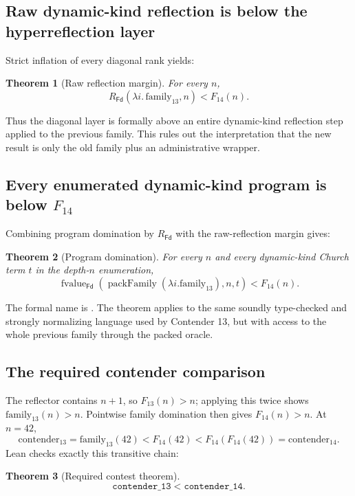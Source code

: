 \documentclass[11pt]{article}
\newtheorem{theorem}{Theorem}[section]
\theoremstyle{definition}
\newcommand{\Fd}{\mathsf{Fd}}
\begin{document}
\subsection{Raw dynamic-kind reflection is below the hyperreflection layer}

Strict inflation of every diagonal rank yields:

\begin{theorem}[Raw reflection margin]
For every $n$,
\[
 R_{\Fd}(\lambda i.\,\mathrm{family}_{13},n)<F_{14}(n).
\]
\end{theorem}

Thus the diagonal layer is formally above an entire dynamic-kind reflection step applied to the previous family.  This rules out the interpretation that the new result is only the old family plus an administrative wrapper.

\subsection{\texorpdfstring{Every enumerated dynamic-kind program is below $F_{14}$}{Every enumerated dynamic-kind program is below F14}}

Combining program domination by $R_{\Fd}$ with the raw-reflection margin gives:

\begin{theorem}[Program domination]
For every $n$ and every dynamic-kind Church term $t$ in the depth-$n$ enumeration,
\[
  \operatorname{fvalue}_{\Fd}
    (\operatorname{packFamily}(\lambda i.\mathrm{family}_{13}),n,t)
  <F_{14}(n).
\]
\end{theorem}

The formal name is .  The theorem applies to the same soundly type-checked and strongly normalizing language used by Contender 13, but with access to the whole previous family through the packed oracle.

\subsection{The required contender comparison}

The reflector contains $n+1$, so $F_{13}(n)>n$; applying this twice shows $\mathrm{family}_{13}(n)>n$.  Pointwise family domination then gives $F_{14}(n)>n$.  At $n=42$,
\[
 \mathrm{contender}_{13}
 =\mathrm{family}_{13}(42)
 <F_{14}(42)
 <F_{14}(F_{14}(42))
 =\mathrm{contender}_{14}.
\]
Lean checks exactly this transitive chain:

\begin{theorem}[Required contest theorem]
\[
  \texttt{contender\_13}<\texttt{contender\_14}.
\]
\end{theorem}
\end{document}
